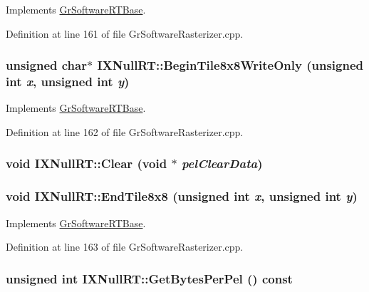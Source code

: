 Implements \hyperlink{class_gr_software_r_t_base_327778f4649ef0ac403a2eb9fde3031d}{GrSoftwareRTBase}.

Definition at line 161 of file GrSoftwareRasterizer.cpp.\hypertarget{class_i_x_null_r_t_2bf9c2cf6c9e67cd29739456f1bc4e11}{
\subsubsection[{BeginTile8x8WriteOnly}]{\setlength{\rightskip}{0pt plus 5cm}unsigned char$\ast$ IXNullRT::BeginTile8x8WriteOnly (unsigned int {\em x}, \/  unsigned int {\em y})}}
\label{class_i_x_null_r_t_2bf9c2cf6c9e67cd29739456f1bc4e11}




Implements \hyperlink{class_gr_software_r_t_base_8105b579f48de033a1f78c98b843d3e9}{GrSoftwareRTBase}.

Definition at line 162 of file GrSoftwareRasterizer.cpp.\hypertarget{class_i_x_null_r_t_b52bf96df67795082011895ed5173c1b}{
\subsubsection[{Clear}]{\setlength{\rightskip}{0pt plus 5cm}void IXNullRT::Clear (void $\ast$ {\em pelClearData})}}
\label{class_i_x_null_r_t_b52bf96df67795082011895ed5173c1b}


\hypertarget{class_i_x_null_r_t_483a293eb0878d94101cf84ba12632cd}{
\subsubsection[{EndTile8x8}]{\setlength{\rightskip}{0pt plus 5cm}void IXNullRT::EndTile8x8 (unsigned int {\em x}, \/  unsigned int {\em y})}}
\label{class_i_x_null_r_t_483a293eb0878d94101cf84ba12632cd}




Implements \hyperlink{class_gr_software_r_t_base_152b9d2964518f0c50ff8ced3f3da097}{GrSoftwareRTBase}.

Definition at line 163 of file GrSoftwareRasterizer.cpp.\hypertarget{class_i_x_null_r_t_9217a8a15e5fde56c766502cdb1cdf4f}{
\subsubsection[{GetBytesPerPel}]{\setlength{\rightskip}{0pt plus 5cm}unsigned int IXNullRT::GetBytesPerPel () const}}
\label{class_i_x_null_r_t_9217a8a15e5fde56c766502cdb1cdf4f}




